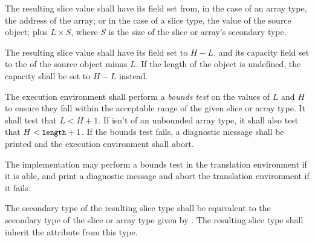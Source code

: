 \specsubsubitem
The resulting slice value shall have its  field set from, in the case
of an array type, the address of the array; or in the case of a slice type, the
 value of the source object; plus $L \times S$, where $S$ is the
size of the slice or array's secondary type.

\specsubsubitem
The resulting slice value shall have its  field set to $H - L$,
and its capacity field set to the  of the source object minus $L$.
If the length of the object is undefined, the capacity shall be set to $H - L$
instead.

\specsubsubitem
The execution environment shall perform a \textit{bounds test} on the values of
$L$ and $H$ to ensure they fall within the acceptable range of the given slice
or array type. It shall test that $L < H+1$. If 
isn't of an unbounded array type, it shall also test that $H < \mbox{\textup{\small\texttt{length}}}+1$.
If the bounds test fails, a diagnostic message shall be printed and the
execution environment shall abort.

The implementation may perform a bounds test in the translation environment if
it is able, and print a diagnostic message and abort the translation environment
if it fails.

\specsubsubitem
The secondary type of the resulting slice type shall be equivalent to the
secondary type of the slice or array type given by
. The resulting slice type shall inherit the
 attribute from this type.


\begin{grammar}
 \\
	 \\
	 \\
	 \\

 \\
	  \terminal{(}  \terminal{,}  \terminal{)} \\
	  \terminal{(}  \terminal{,}   \terminal{)} \\
	  \terminal{(}  \terminal{,}  \terminal{,}  \terminal{)} \\
\end{grammar}

